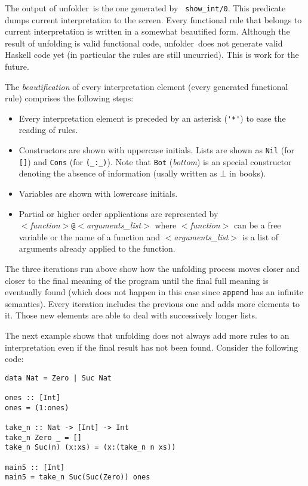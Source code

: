 \documentclass[11pt,a4paper,twoside,openright]{book}
\newcommand{\unfolder}{{\textsf{unfolder~}}}
\begin{document}
The output of \unfolder is the one generated by {\tt
  show\_int/0}. This predicate dumps current interpretation to the
screen. Every functional rule that belongs to current interpretation
is written in a somewhat beautified form. Although the result of
unfolding is valid functional code, \unfolder does not generate valid
Haskell code yet (in particular the rules are still uncurried). This
is work for the future.

The {\em beautification} of every interpretation element (every
generated functional rule) comprises the following steps:

\begin{itemize}
\item
Every interpretation element is preceded by an asterisk (\verb.'*'.)
to ease the reading of rules.

\item
Constructors are shown with uppercase initials. Lists are shown as
{\tt Nil} (for {\tt []}) and {\tt Cons} (for {\tt (\_:\_)}). Note that
{\tt Bot} ({\em bottom}) is an special constructor denoting the absence of
information (usally written as $\bot$ in books).

\item
Variables are shown with lowercase initials.

\item
Partial or higher order applications are represented by \\ 
{\em $<$function$>$}{\tt @}{\em $<$arguments\_list$>$} where {\em
  $<$function$>$} can be a free variable or the name of a function and
{\em $<$arguments\_list$>$} is a list of arguments already applied to the
function. 
\end{itemize}  

\noindent
The three iterations run above show how the unfolding process moves
closer and closer to the final meaning of the program until the final
full meaning is eventually found (which does not happen in this case
since {\tt append} has an infinite semantics). Every iteration
includes the previous one and adds more elements to it. Those new
elements are able to deal with successively longer lists.

The next example shows that unfolding does not always add more rules
to an interpretation even if the final result has not been
found. Consider the following code:

\begin{verbatim}
data Nat = Zero | Suc Nat

ones :: [Int]
ones = (1:ones)

take_n :: Nat -> [Int] -> Int
take_n Zero _ = []
take_n Suc(n) (x:xs) = (x:(take_n n xs))

main5 :: [Int]
main5 = take_n Suc(Suc(Zero)) ones
\end{verbatim}
\end{document}
